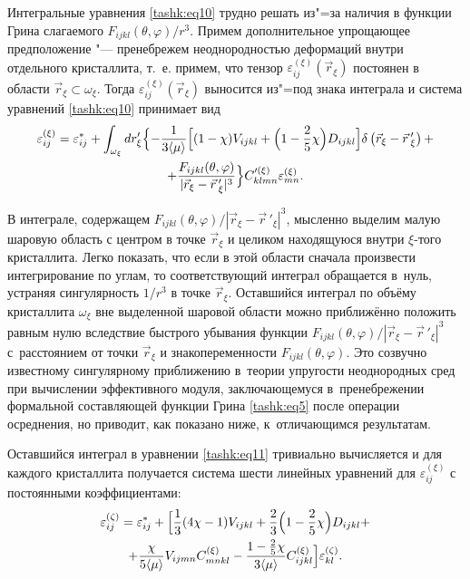 Интегральные уравнения \eqref{tashk:eq10} трудно решать из"=за наличия в функции Грина
слагаемого $F_{ijkl}(\theta,\varphi)/r^3$. Примем дополнительное
упрощающее предположение "--- пренебрежем неоднородностью деформаций внутри
отдельного кристаллита, т.~е. примем, что тензор $\varepsilon _{ij}^{(\xi )}
(\vec {r}_\xi)$ постоянен в области $\vec {r}_\xi \subset \omega _\xi$.
Тогда $\varepsilon _{ij}^{(\xi )} (\vec {r}_\xi )$ выносится из"=под знака интеграла и система уравнений \eqref{tashk:eq10} принимает вид
\begin{multline}
\label{tashk:eq11}
\varepsilon_{ij}^{(\xi)} =\varepsilon_{ij}^\ast +\int_{\omega_\xi} d r'_\xi 
\Bigl \{ -\frac{1}{3\langle \mu \rangle} \Bigl[ (1-\chi )V_{ijkl}+\Bigl(1-\frac{2}{5} \chi \Bigr)D_{ijkl} \Bigr] \delta \left(\vec {r}_\xi -\vec {r}\,'_\xi \right)
+ \\ +\frac{F_{ijkl} (\theta ,\varphi )}{| \vec {r}_\xi - \vec {r}\,'_\xi |^3}
 \Bigr\} C_{klmn}^{\prime (\xi )} \varepsilon _{mn}^{(\xi)}.
\end{multline}

В интеграле, содержащем $F_{ijkl} (\theta,\varphi)/| \vec {r}_\xi -\vec {r}\,'_\xi |^3$, мысленно выделим малую шаровую область с центром в точке $\vec {r}_\xi$ и целиком находящуюся внутри $\xi $-того кристаллита. 
Легко показать, что если в этой области сначала произвести интегрирование по углам, то соответствующий интеграл обращается в~нуль, устраняя сингулярность $1 /r^3$ в точке $\vec {r}_\xi$. 
Оставшийся интеграл по объёму кристаллита $\omega _\xi$ вне выделенной шаровой области можно приближённо положить равным нулю вследствие быстрого убывания функции $F_{ijkl} (\theta,\varphi)/| \vec {r}_\xi -\vec {r}\,'_\xi|^3$ с~расстоянием от точки $\vec {r}_\xi$ и знакопеременности $F_{ijkl} (\theta,\varphi)$. 
Это созвучно известному сингулярному приближению в~теории упругости неоднородных сред при вычислении эффективного модуля, заключающемуся в~пренебрежении формальной составляющей функции Грина \eqref{tashk:eq5} после операции осреднения, но приводит, как показано ниже, к~отличающимся результатам.

Оставшийся интеграл в уравнении \eqref{tashk:eq11} тривиально вычисляется и для каждого
кристаллита получается система шести линейных уравнений для $\varepsilon
_{ij}^{(\xi)}$ с постоянными коэффициентами:
\begin{multline}
\label{tashk:eq12}
\varepsilon _{ij}^{(\zeta )} =\varepsilon _{ij}^\ast +
\Bigl[
\frac{1}{3}(4\chi -1)V_{ijkl} +\frac{2}{3}\Bigl(1-\frac{2}{5}\chi \Bigr)D_{ijkl}
+\\
+\frac{\chi }{5\langle \mu \rangle }V_{ijmn} C_{mnkl}^{(\xi )}
-\frac{1-\frac{2}{5}\chi}{3\langle \mu \rangle }C_{ijkl}^{(\xi )}\Bigr]\varepsilon _{kl}^{(\zeta )}.
\end{multline}

